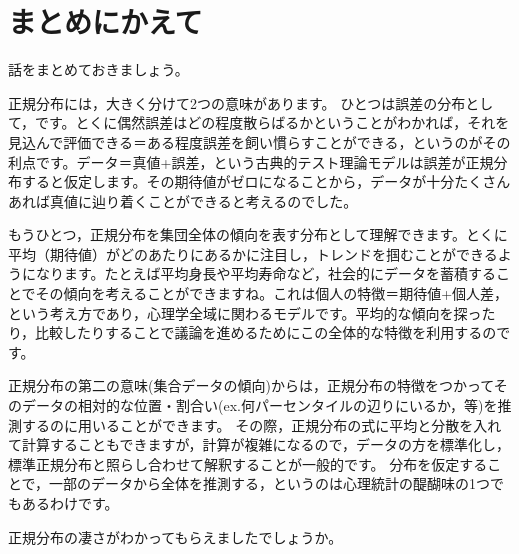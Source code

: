 \section{まとめにかえて}
話をまとめておきましょう。

正規分布には，大きく分けて2つの意味があります。
ひとつは誤差の分布として，です。とくに偶然誤差はどの程度散らばるかということがわかれば，それを見込んで評価できる＝ある程度誤差を飼い慣らすことができる，というのがその利点です。データ＝真値+誤差，という古典的テスト理論モデルは誤差が正規分布すると仮定します。その期待値がゼロになることから，データが十分たくさんあれば真値に辿り着くことができると考えるのでした。

もうひとつ，正規分布を集団全体の傾向を表す分布として理解できます。とくに平均（期待値）がどのあたりにあるかに注目し，トレンドを掴むことができるようになります。たとえば平均身長や平均寿命など，社会的にデータを蓄積することでその傾向を考えることができますね。これは個人の特徴＝期待値+個人差，という考え方であり，心理学全域に関わるモデルです。平均的な傾向を探ったり，比較したりすることで議論を進めるためにこの全体的な特徴を利用するのです。

正規分布の第二の意味(集合データの傾向)からは，正規分布の特徴をつかってそのデータの相対的な位置・割合い(ex.何パーセンタイルの辺りにいるか，等)を推測するのに用いることができます。
その際，正規分布の式に平均と分散を入れて計算することもできますが，計算が複雑になるので，データの方を標準化し，標準正規分布と照らし合わせて解釈することが一般的です。
分布を仮定することで，一部のデータから全体を推測する，というのは心理統計の醍醐味の1つでもあるわけです。

正規分布の凄さがわかってもらえましたでしょうか。